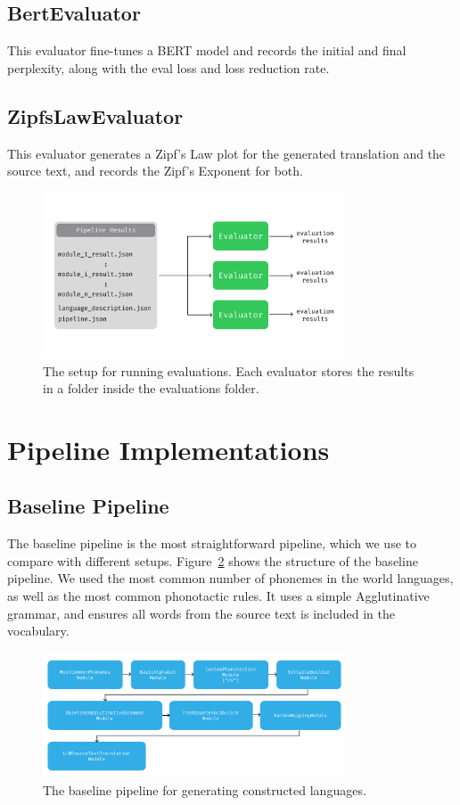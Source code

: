 \subsection{BertEvaluator}
This evaluator fine-tunes a BERT model and records the initial and final perplexity, along with the eval loss and loss reduction rate.
\subsection{ZipfsLawEvaluator}
This evaluator generates a Zipf's Law plot for the generated translation and the source text, and records the Zipf's Exponent for both.

\begin{figure}
    \centering
    \includegraphics[width=0.8\textwidth]{figures/evaluations_structure.png}
    \caption{The setup for running evaluations. Each evaluator stores the results in a folder inside the evaluations folder.}
    \label{fig:evaluations_structure}
\end{figure}

\section{Pipeline Implementations}
\subsection{Baseline Pipeline}
 The baseline pipeline is the most straightforward pipeline, which we use to compare with different setups. Figure~\ref{fig:baseline_pipeline} 
 shows the structure of the baseline pipeline. We used the most common number of phonemes in the world languages, as well as the most common
 phonotactic rules. It uses a simple Agglutinative grammar, and ensures all words from the source text is included in the vocabulary.
 
\begin{figure}
    \centering
    \includegraphics[width=0.8\textwidth]{figures/baseline_pipeline.png}
    \caption{The baseline pipeline for generating constructed languages.}
    \label{fig:baseline_pipeline}
\end{figure}
